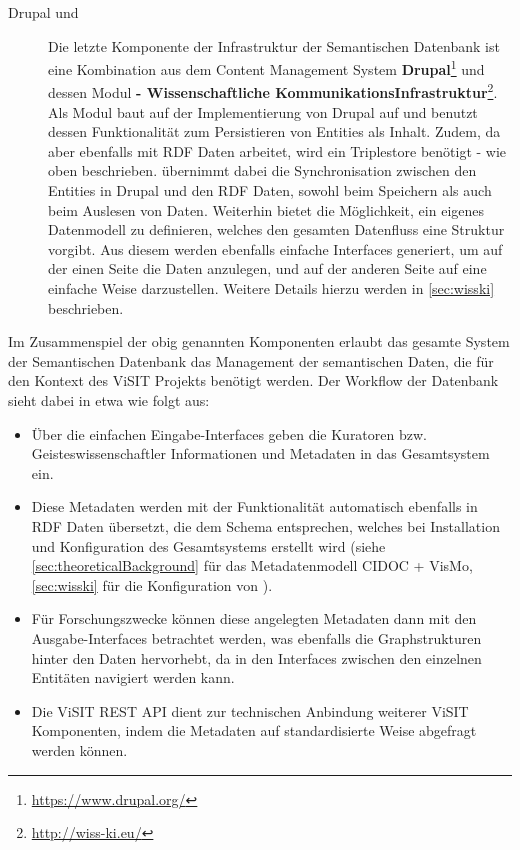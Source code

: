 \begin{description}
	\item[Drupal und \wisski] Die letzte Komponente der Infrastruktur der Semantischen Datenbank ist eine Kombination aus dem Content Management System \textbf{Drupal}\footnote{\url{https://www.drupal.org/}} und dessen Modul \textbf{\wisski - Wissenschaftliche KommunikationsInfrastruktur}\footnote{\url{http://wiss-ki.eu/}}. Als Modul baut \wisski auf der Implementierung von Drupal auf und benutzt dessen Funktionalität zum Persistieren von Entities als Inhalt. Zudem, da \wisski aber ebenfalls mit RDF Daten arbeitet, wird ein Triplestore benötigt - wie oben beschrieben. \wisski übernimmt dabei die Synchronisation zwischen den Entities in Drupal und den RDF Daten, sowohl beim Speichern als auch beim Auslesen von Daten. Weiterhin bietet \wisski die Möglichkeit, ein eigenes Datenmodell zu definieren, welches den gesamten Datenfluss eine Struktur vorgibt. Aus diesem werden ebenfalls einfache Interfaces generiert, um auf der einen Seite die Daten anzulegen, und auf der anderen Seite auf eine einfache Weise darzustellen. Weitere Details hierzu werden in \autoref{sec:wisski} beschrieben.
\end{description}

Im Zusammenspiel der obig genannten Komponenten erlaubt das gesamte System der Semantischen Datenbank das Management der semantischen Daten, die für den Kontext des ViSIT Projekts benötigt werden. Der Workflow der Datenbank sieht dabei in etwa wie folgt aus:

\begin{itemize}
	\item Über die einfachen \wisski Eingabe-Interfaces geben die Kuratoren bzw. Geisteswissenschaftler Informationen und Metadaten in das Gesamtsystem ein.
	\item Diese Metadaten werden mit der \wisski Funktionalität automatisch ebenfalls in RDF Daten übersetzt, die dem Schema entsprechen, welches bei Installation und Konfiguration des Gesamtsystems erstellt wird (siehe \autoref{sec:theoreticalBackground} für das Metadatenmodell CIDOC + VisMo, \autoref{sec:wisski} für die Konfiguration von \wisski).
	\item Für Forschungszwecke können diese angelegten Metadaten dann mit den \wisski Ausgabe-Interfaces betrachtet werden, was ebenfalls die Graphstrukturen hinter den Daten hervorhebt, da in den Interfaces zwischen den einzelnen Entitäten navigiert werden kann.
	\item Die ViSIT REST API dient zur technischen Anbindung weiterer ViSIT Komponenten, indem die Metadaten auf standardisierte Weise abgefragt werden können.
\end{itemize}

